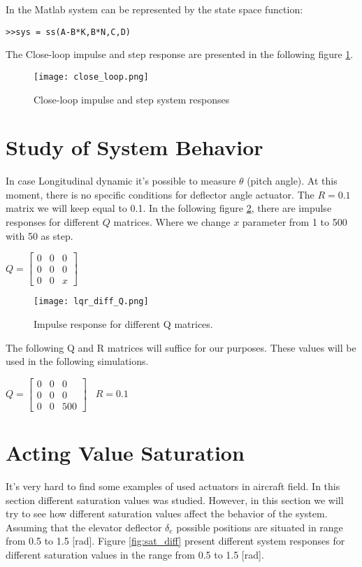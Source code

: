 In the Matlab system can be represented by the state space function:
\begin{lstlisting}[frame=single]
>>sys = ss(A-B*K,B*N,C,D)
\end{lstlisting}

The Close-loop impulse and step response are presented in the following
figure \ref{fig:close_loop}.

\begin{figure}[h!]
    \centering
    \texttt{[image: close\_loop.png]}
    \caption{Close-loop impulse and step system responses}
    \label{fig:close_loop}
\end{figure}

\section{Study of System Behavior}

In case Longitudinal dynamic it's possible to measure $\theta$ (pitch
angle). At this moment, there is no specific conditions for deflector angle actuator. The
$R = 0.1$ matrix we will keep equal to 0.1. In the following figure
\ref{fig:diff_Q}, there are impulse responses for 
different $Q$ matrices. Where we change $x$ parameter from 1 to 500 with 50 as
step.


$Q = \begin{bmatrix}  0 & 0 & 0 \\
                      0 & 0 & 0 \\
                      0 & 0 & x \end{bmatrix}$ \\

\begin{figure}[hbt!]
    \centering
    \texttt{[image: lqr\_diff\_Q.png]}
    \caption{Impulse response for different Q matrices.}
    \label{fig:diff_Q}
\end{figure}
The following Q and R matrices will suffice for our purposes. These values
will be used in the following simulations.

$Q = \begin{bmatrix}  0 & 0 & 0 \\
                      0 & 0 & 0 \\
                      0 & 0 & 500 \end{bmatrix}$  \
$R = 0.1$

\section{Acting Value Saturation}
It's very hard to find some examples of used actuators in aircraft field.
In this section different saturation values was studied.  However, in this
section we will try to see how different saturation values affect the
behavior of the system. Assuming that the elevator deflector $\delta_e$ 
possible positions are situated in range from 0.5 to 1.5 [rad].
Figure \ref{fig:sat_diff} present different system responses for different saturation
values in the range from 0.5 to 1.5 [rad].

